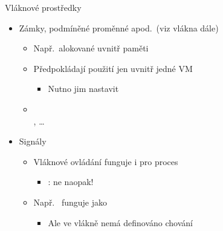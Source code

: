 \begin{frame}{Vláknové prostředky}

  \begin{itemize}
    \item Zámky, podmíněné proměnné apod.\ (viz vlákna dále)
    \begin{itemize}
      \item Např.\ alokované uvnitř  paměti

      \pause

      \item Předpokládají použití jen uvnitř jedné VM
      \begin{itemize}
	\item Nutno jim nastavit 
      \end{itemize}

      \pause

      \item {} \\
        , \dots
    \end{itemize}

    \pause

    \item Signály
    \begin{itemize}
      \item Vláknové ovládání funguje i pro proces
      \begin{itemize}
	\item \pozor: ne naopak!
      \end{itemize}

      \pause

      \item Např.\  funguje jako 

      \pause

      \begin{itemize}
	\item Ale  ve vlákně nemá definováno chování
      \end{itemize}
    \end{itemize}
  \end{itemize}

\end{frame}

